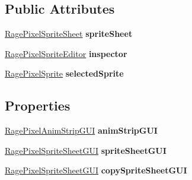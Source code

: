 \subsection*{Public Attributes}
\begin{DoxyCompactItemize}
\item 
\hypertarget{class_rage_pixel_sprite_sheet_editor_window_a86ff0367c7f404395218fcee71124f42}{\hyperlink{class_rage_pixel_sprite_sheet}{Rage\-Pixel\-Sprite\-Sheet} {\bfseries sprite\-Sheet}}\label{class_rage_pixel_sprite_sheet_editor_window_a86ff0367c7f404395218fcee71124f42}

\item 
\hypertarget{class_rage_pixel_sprite_sheet_editor_window_a22e08ebd95ce65317e5e302486ebef3d}{\hyperlink{class_rage_pixel_sprite_editor}{Rage\-Pixel\-Sprite\-Editor} {\bfseries inspector}}\label{class_rage_pixel_sprite_sheet_editor_window_a22e08ebd95ce65317e5e302486ebef3d}

\item 
\hypertarget{class_rage_pixel_sprite_sheet_editor_window_ae55f59a21aec80b97d91122baa39d5b6}{\hyperlink{class_rage_pixel_sprite}{Rage\-Pixel\-Sprite} {\bfseries selected\-Sprite}}\label{class_rage_pixel_sprite_sheet_editor_window_ae55f59a21aec80b97d91122baa39d5b6}

\end{DoxyCompactItemize}
\subsection*{Properties}
\begin{DoxyCompactItemize}
\item 
\hypertarget{class_rage_pixel_sprite_sheet_editor_window_aa6509346df3bb405df0b4a62a5560595}{\hyperlink{class_rage_pixel_anim_strip_g_u_i}{Rage\-Pixel\-Anim\-Strip\-G\-U\-I} {\bfseries anim\-Strip\-G\-U\-I}}\label{class_rage_pixel_sprite_sheet_editor_window_aa6509346df3bb405df0b4a62a5560595}

\item 
\hypertarget{class_rage_pixel_sprite_sheet_editor_window_a17abd4fc52a987957efd2b3593b6d160}{\hyperlink{class_rage_pixel_sprite_sheet_g_u_i}{Rage\-Pixel\-Sprite\-Sheet\-G\-U\-I} {\bfseries sprite\-Sheet\-G\-U\-I}}\label{class_rage_pixel_sprite_sheet_editor_window_a17abd4fc52a987957efd2b3593b6d160}

\item 
\hypertarget{class_rage_pixel_sprite_sheet_editor_window_a219779fe46c4db7dbae9e4dcafede74f}{\hyperlink{class_rage_pixel_sprite_sheet_g_u_i}{Rage\-Pixel\-Sprite\-Sheet\-G\-U\-I} {\bfseries copy\-Sprite\-Sheet\-G\-U\-I}}\label{class_rage_pixel_sprite_sheet_editor_window_a219779fe46c4db7dbae9e4dcafede74f}

\end{DoxyCompactItemize}


